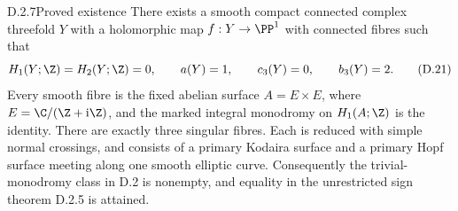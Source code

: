 
\begin{idstatement}{D.2.7}{Proved existence}
\label{st:D.2.7}
There exists a smooth compact connected complex threefold $Y$
with a holomorphic map $f:Y\to\PP^1$ with connected fibres such
that
\[
 H_1(Y;\Z)=H_2(Y;\Z)=0,\qquad
 a(Y)=1,\qquad c_3(Y)=0,\qquad b_3(Y)=2.
\tag{D.21}
\]
Every smooth fibre is the fixed abelian surface
$A=E\times E$, where $E=\C/(\Z+\mathrm i\Z)$, and the marked
integral monodromy on $H_1(A;\Z)$ is the identity. There are
exactly three singular fibres. Each is reduced with simple
normal crossings, and consists of a primary Kodaira surface
and a primary Hopf surface meeting along one smooth elliptic
curve. Consequently the trivial-monodromy class in D.2 is
nonempty, and equality in the unrestricted sign theorem
D.2.5 is attained.
\end{idstatement}
